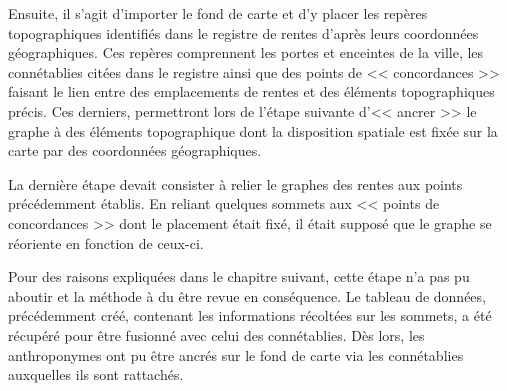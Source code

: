 Ensuite, il s'agit d'importer le fond de carte et d'y placer les repères topographiques identifiés dans le registre de rentes d'après leurs coordonnées géographiques. Ces repères comprennent les portes et enceintes de la ville, les connétablies citées dans le registre ainsi que des points de << concordances >> faisant le lien entre des emplacements de rentes et des éléments topographiques précis. Ces derniers, permettront lors de l'étape suivante d'<< ancrer >> le graphe à des éléments topographique dont la disposition spatiale est fixée sur la carte par des coordonnées géographiques.

La dernière étape devait consister à relier le graphes des rentes aux points précédemment établis. En reliant quelques sommets aux << points de concordances >> dont le placement était fixé, il était supposé que le graphe se réoriente en fonction de ceux-ci. 

Pour des raisons expliquées dans le chapitre suivant, cette étape n'a pas pu aboutir et la méthode à du être revue  en conséquence.
Le tableau de données, précédemment créé, contenant les informations récoltées sur les sommets, a été récupéré pour être fusionné avec celui des connétablies. Dès lors, les anthroponymes ont pu être ancrés sur le fond de carte  via  les connétablies auxquelles ils sont rattachés.
